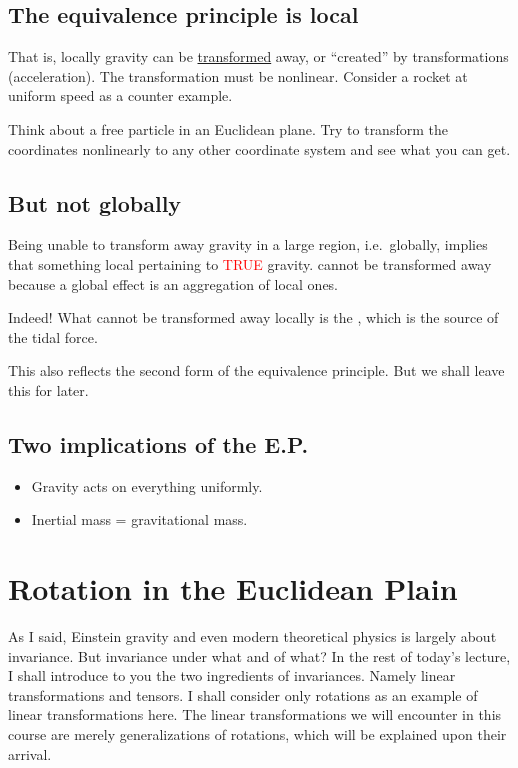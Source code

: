 \documentclass[11pt,fleqn]{book} %
\begin{document}
\subsection{The equivalence principle is local}
That is, locally gravity can be \uline{transformed} away, or ``created'' by
transformations (acceleration).
The transformation must be nonlinear.
Consider a rocket at uniform speed as a counter example.
\begin{exercise}
  Think about a free particle in an Euclidean plane. Try to transform the
  coordinates nonlinearly to any other coordinate system and see what you can get.
\end{exercise}

\subsection{But not globally}
\begin{figure}[h]
\centering
\end{figure}
Being unable to transform away gravity in a large region, i.e.\ globally, implies
that something local pertaining to \textcolor{red}{\uppercase{true}} gravity.
cannot be transformed away because a global effect is an aggregation of local ones.
\begin{emphbox}
  Indeed! What cannot be transformed away locally is the ,
  which is the source of the tidal force.
\end{emphbox}
\begin{remark}
  This also reflects the second form of the equivalence principle. But we shall
  leave this for later.
\end{remark}

\subsection{Two implications of the E.P.\ }
\begin{emphbox}
  \begin{itemize}[label={--},leftmargin=*]
  \item Gravity acts on everything uniformly.
  \item Inertial mass = gravitational mass.
  \end{itemize}
\end{emphbox}

\section{Rotation in the Euclidean Plain}
As I said, Einstein gravity and even modern theoretical physics is largely about
invariance. But invariance under what and of what? In the rest of today's
lecture, I shall introduce to you the two ingredients of invariances. Namely
linear transformations and tensors. I shall consider only rotations as an
example of linear transformations here. The linear transformations we will
encounter in this course are merely generalizations of rotations, which will be
explained upon their arrival.
\end{document}
